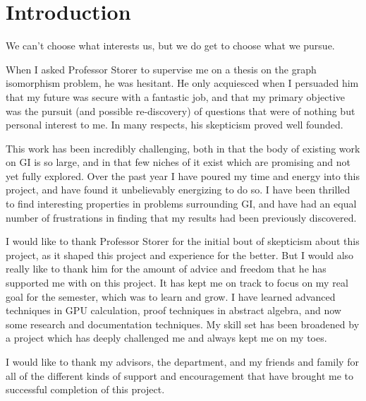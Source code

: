 \chapter*{Introduction}
We can't choose what interests us, but we do get to choose what we pursue.

When I asked Professor Storer to supervise me on a thesis on the graph isomorphism problem, he was hesitant.
He only acquiesced when I persuaded him that my future was secure with a fantastic job, and that my primary objective was the pursuit (and possible re-discovery) of questions that were of nothing but personal interest to me.
In many respects, his skepticism proved well founded.

This work has been incredibly challenging, both in that the body of existing work on GI is so large, and in that few niches of it exist which are promising and not yet fully explored.
Over the past year I have poured my time and energy into this project, and have found it unbelievably energizing to do so.
I have been thrilled to find interesting properties in problems surrounding GI, and have had an equal number of frustrations in finding that my results had been previously discovered.

I would like to thank Professor Storer for the initial bout of skepticism about this project, as it shaped this project and experience for the better.
But I would also really like to thank him for the amount of advice and freedom that he has supported me with on this project.
It has kept me on track to focus on my real goal for the semester, which was to learn and grow.
I have learned advanced techniques in GPU calculation, proof techniques in abstract algebra, and now some research and documentation techniques.
My skill set has been broadened by a project which has deeply challenged me and always kept me on my toes.

I would like to thank my advisors, the department, and my friends and family for all of the different kinds of support and encouragement that have brought me to successful completion of this project.
